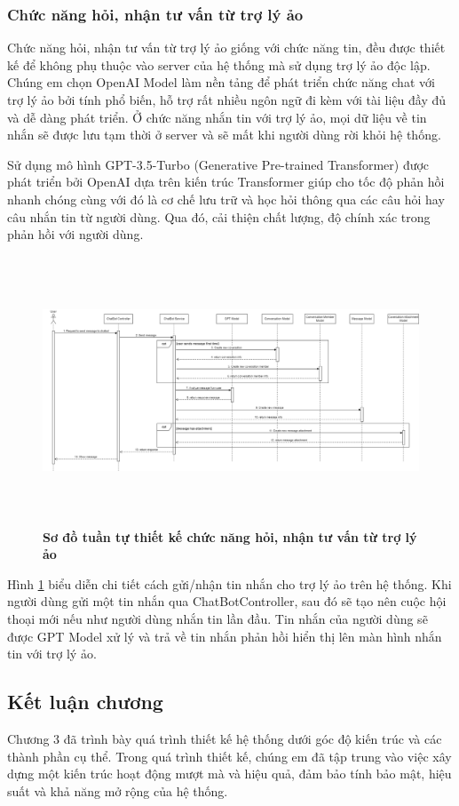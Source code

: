 \subsubsection{Chức năng hỏi, nhận tư vấn từ trợ lý ảo}
Chức năng hỏi, nhận tư vấn từ trợ lý ảo giống với chức năng tin, đều được thiết kế để không phụ thuộc vào server của
hệ thống mà sử dụng trợ lý ảo độc lập. Chúng em chọn OpenAI Model làm nền tảng để phát triển
chức năng chat với trợ lý ảo bởi tính phổ biến, hỗ trợ rất nhiều ngôn ngữ đi kèm với tài liệu đầy
đủ và dễ dàng phát triển. Ở chức năng nhắn tin với trợ lý ảo, mọi dữ liệu về tin nhắn sẽ được lưu tạm thời ở 
server và sẽ mất khi người dùng rời khỏi hệ thống.

Sử dụng mô hình GPT-3.5-Turbo (Generative Pre-trained Transformer) được phát triển bởi OpenAI dựa trên kiến trúc Transformer giúp 
cho tốc độ phản hồi nhanh chóng cùng với đó là cơ chế lưu trữ và học hỏi thông qua các câu hỏi hay câu nhắn tin từ người dùng. 
Qua đó, cải thiện chất lượng, độ chính xác trong phản hồi với người dùng.

\begin{figure}[H]
  \centering
  \includegraphics[width=16cm,height=8cm]{Images/sequence_api/sendMessageChatBot.png}
  \caption[Sơ đồ tuần tự thiết kế chức năng hỏi, nhận tư vấn từ trợ lý ảo]{\bfseries \fontsize{12pt}{0pt}
  \selectfont Sơ đồ tuần tự thiết kế chức năng hỏi, nhận tư vấn từ trợ lý ảo}
  \label{api_sendMessageChatBot} %
\end{figure}
Hình \ref{api_sendMessageChatBot} biểu diễn chi tiết cách gửi/nhận tin nhắn cho trợ lý ảo trên hệ thống. Khi người dùng gửi một tin nhắn qua ChatBotController, sau đó sẽ tạo nên cuộc hội thoại mới nếu như người dùng nhắn tin lần đầu. 
Tin nhắn của người dùng sẽ được GPT Model xử lý và trả về tin nhắn phản hồi hiển thị lên màn hình nhắn tin với trợ lý ảo.
\subsection{Kết luận chương}

Chương 3 đã trình bày quá trình thiết kế hệ thống 
dưới góc độ kiến trúc và các thành
 phần cụ thể. Trong quá trình thiết kế, chúng em đã tập trung
  vào việc xây dựng một kiến trúc hoạt động mượt mà và hiệu quả,
   đảm bảo tính bảo mật, hiệu suất và khả năng mở rộng của hệ
    thống.

\newpage